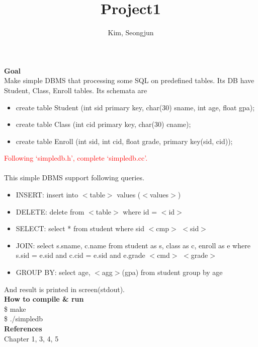 \documentclass[11pt]{article}
\title{Project1}
\author{Kim, Seongjun}
\newcommand{\head}[1]{\LARGE \textbf{#1} \normalsize \\}
\begin{document}
\maketitle
\head{Goal}
Make simple DBMS that processing some SQL on predefined tables. Its DB have Student, Class, Enroll tables. Its schemata are

\begin{itemize}
	\item create table Student (int sid primary key, char(30) sname, int age, float gpa);
	\item create table Class (int cid primary key, char(30) cname);
	\item create table Enroll (int sid, int cid, float grade, primary key(sid, cid));
\end{itemize}

\textcolor{red}{Following `simpledb.h', complete `simpledb.cc'.}
\\
\\
This simple DBMS support following queries.

\begin{itemize}
	\item INSERT: insert into $<$table$>$ values ($<$values$>$)
	\item DELETE: delete from $<$table$>$ where id = $<$id$>$
	\item SELECT: select * from student where sid $<$cmp$>$ $<$sid$>$
	\item JOIN: select s.sname, c.name from student as s, class as c, enroll as e where s.sid = e.sid and c.cid = e.sid and e.grade $<$cmd$>$ $<$grade$>$
	\item GROUP BY: select age, $<$agg$>$(gpa) from student group by age
\end{itemize} 

And result is printed in screen(stdout).
\\

\head{How to compile \& run}
	\$ make \\
	\$ ./simpledb
\\

\head{References}
Chapter 1, 3, 4, 5
\end{document}
